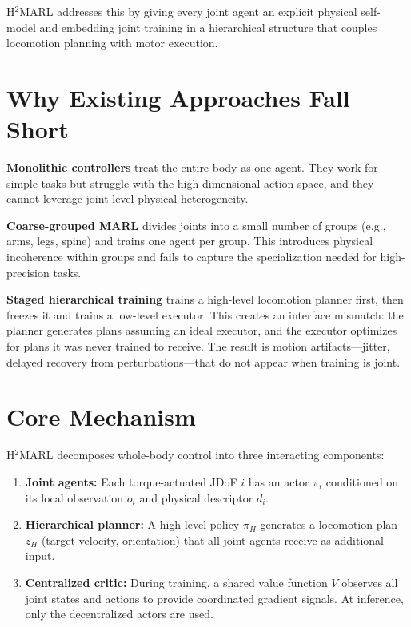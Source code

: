 \documentclass[10pt,twocolumn]{article}
\begin{document}
H$^2$MARL addresses this by giving every joint agent an explicit physical self-model and embedding joint training in a hierarchical structure that couples locomotion planning with motor execution.

\section{Why Existing Approaches Fall Short}

\textbf{Monolithic controllers} treat the entire body as one agent.
They work for simple tasks but struggle with the high-dimensional action space, and they cannot leverage joint-level physical heterogeneity.

\textbf{Coarse-grouped MARL} divides joints into a small number of groups (e.g., arms, legs, spine) and trains one agent per group.
This introduces physical incoherence within groups and fails to capture the specialization needed for high-precision tasks.

\textbf{Staged hierarchical training} trains a high-level locomotion planner first, then freezes it and trains a low-level executor.
This creates an interface mismatch: the planner generates plans assuming an ideal executor, and the executor optimizes for plans it was never trained to receive.
The result is motion artifacts---jitter, delayed recovery from perturbations---that do not appear when training is joint.

\section{Core Mechanism}

H$^2$MARL decomposes whole-body control into three interacting components:

\begin{enumerate}[leftmargin=1.5em,itemsep=2pt]
  \item \textbf{Joint agents:} Each torque-actuated JDoF $i$ has an actor $\pi_i$ conditioned on its local observation $o_i$ and physical descriptor $d_i$.
  \item \textbf{Hierarchical planner:} A high-level policy $\pi_H$ generates a locomotion plan $z_H$ (target velocity, orientation) that all joint agents receive as additional input.
  \item \textbf{Centralized critic:} During training, a shared value function $V$ observes all joint states and actions to provide coordinated gradient signals. At inference, only the decentralized actors are used.
\end{enumerate}
\end{document}
